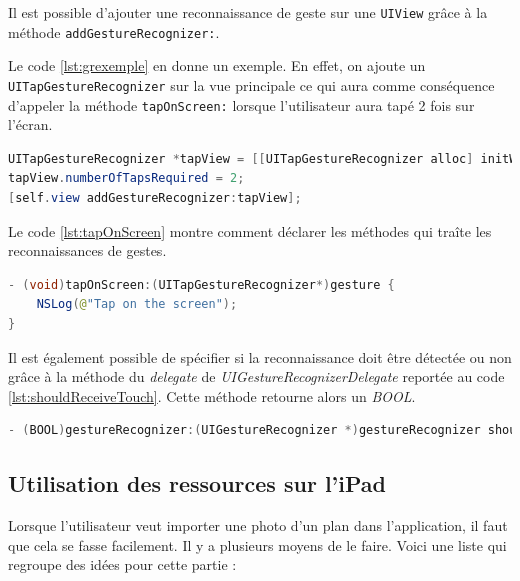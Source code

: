 \bigskip

Il est possible d'ajouter une reconnaissance de geste sur une \texttt{UIView} grâce à la méthode \texttt{addGestureRecognizer:}. 

\medskip

Le code \ref{lst:grexemple} en donne un exemple. En effet, on ajoute un \texttt{UITapGestureRecognizer} sur la vue principale ce qui aura comme conséquence d'appeler la méthode \texttt{tapOnScreen:} lorsque l'utilisateur aura tapé 2 fois sur l'écran.

\begin{lstlisting}[language={JAVA}, caption={Exemple d'ajout gesture recognizer}, label={lst:grexemple}]
UITapGestureRecognizer *tapView = [[UITapGestureRecognizer alloc] initWithTarget:self action:@selector(tapOnScreen:)];
tapView.numberOfTapsRequired = 2;
[self.view addGestureRecognizer:tapView];
\end{lstlisting}

Le code \ref{lst:tapOnScreen} montre comment déclarer les méthodes qui traîte les reconnaissances de gestes.

\begin{lstlisting}[language={JAVA}, caption={Exemple de traitement d'un geste}, label={lst:tapOnScreen}]
- (void)tapOnScreen:(UITapGestureRecognizer*)gesture {
    NSLog(@"Tap on the screen");
}
\end{lstlisting}

Il est également possible de spécifier si la reconnaissance doit être détectée ou non grâce à la méthode du \emph{delegate} de \emph{UIGestureRecognizerDelegate} reportée au code \ref{lst:shouldReceiveTouch}. Cette méthode retourne alors un \emph{BOOL}.
\begin{lstlisting}[language={JAVA}, caption={Gesture shouldReceiveTouch}, label={lst:shouldReceiveTouch}]
- (BOOL)gestureRecognizer:(UIGestureRecognizer *)gestureRecognizer shouldReceiveTouch:(UITouch *)touch;
\end{lstlisting}

\subsection{Utilisation des ressources sur l'iPad} %
\label{sub:utiliser_des_ressources_de_l_ipad}
Lorsque l'utilisateur veut importer une photo d'un plan dans l'application, il faut que cela se fasse facilement. Il y a plusieurs moyens de le faire. Voici une liste qui regroupe des idées pour cette partie : 

